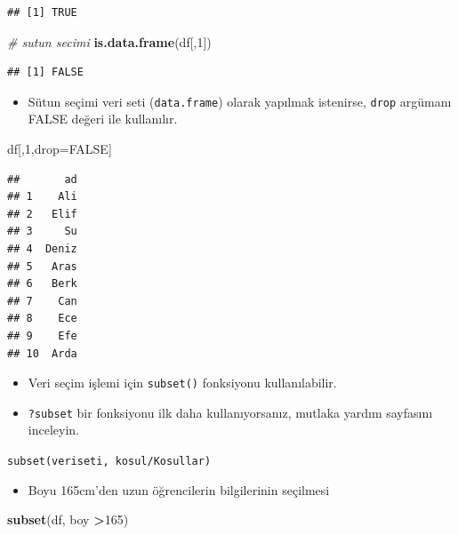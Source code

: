 \documentclass[
  oneside]{book}
\newenvironment{Shaded}{\begin{snugshade}}{\end{snugshade}}
\newcommand{\CommentTok}[1]{\textcolor[rgb]{0.56,0.35,0.01}{\textit{#1}}}
\newcommand{\ConstantTok}[1]{\textcolor[rgb]{0.56,0.35,0.01}{#1}}
\newcommand{\DecValTok}[1]{\textcolor[rgb]{0.00,0.00,0.81}{#1}}
\newcommand{\FunctionTok}[1]{\textcolor[rgb]{0.13,0.29,0.53}{\textbf{#1}}}
\newcommand{\NormalTok}[1]{#1}
\newcommand{\OtherTok}[1]{\textcolor[rgb]{0.56,0.35,0.01}{#1}}
\newcommand{\SpecialCharTok}[1]{\textcolor[rgb]{0.81,0.36,0.00}{\textbf{#1}}}
\providecommand{\tightlist}{%
  \setlength{\itemsep}{0pt}\setlength{\parskip}{0pt}}
\begin{document}
\begin{verbatim}
## [1] TRUE
\end{verbatim}

\begin{Shaded}
\begin{Highlighting}[]
\CommentTok{\# sutun secimi}
\FunctionTok{is.data.frame}\NormalTok{(df[,}\DecValTok{1}\NormalTok{])}
\end{Highlighting}
\end{Shaded}

\begin{verbatim}
## [1] FALSE
\end{verbatim}

\begin{itemize}
\tightlist
\item
  Sütun seçimi veri seti (\texttt{data.frame}) olarak yapılmak istenirse, \texttt{drop} argümanı FALSE değeri ile kullanılır.
\end{itemize}

\begin{Shaded}
\begin{Highlighting}[]
\NormalTok{df[,}\DecValTok{1}\NormalTok{,drop}\OtherTok{=}\ConstantTok{FALSE}\NormalTok{]}
\end{Highlighting}
\end{Shaded}

\begin{verbatim}
##       ad
## 1    Ali
## 2   Elif
## 3     Su
## 4  Deniz
## 5   Aras
## 6   Berk
## 7    Can
## 8    Ece
## 9    Efe
## 10  Arda
\end{verbatim}

\begin{itemize}
\item
  Veri seçim işlemi için \texttt{subset()} fonksiyonu kullanılabilir.
\item
  \texttt{?subset} bir fonksiyonu ilk daha kullanıyorsanız, mutlaka yardım sayfasını inceleyin.
\end{itemize}

\texttt{subset(veriseti,\ kosul/Kosullar)}

\begin{itemize}
\tightlist
\item
  Boyu 165cm'den uzun öğrencilerin bilgilerinin seçilmesi
\end{itemize}

\begin{Shaded}
\begin{Highlighting}[]
\FunctionTok{subset}\NormalTok{(df, boy }\SpecialCharTok{\textgreater{}}\DecValTok{165}\NormalTok{)}
\end{Highlighting}
\end{Shaded}
\end{document}
